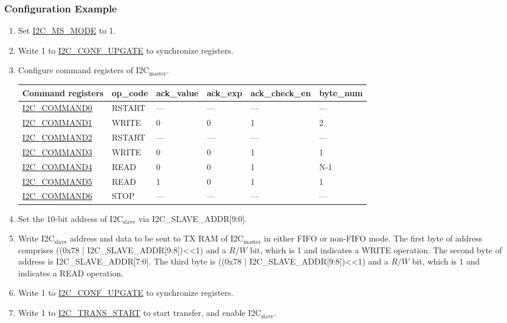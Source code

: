 \documentclass[main\_\_EN.tex]{subfiles}
\begin{document}
\subsubsection{Configuration Example}
\begin{enumerate}
\item Set \hyperref[fielddesc:I2CMSMODE]{I2C\_MS\_MODE} to 1.
\item Write 1 to \hyperref[fielddesc:I2CCONFUPGATE]{I2C\_CONF\_UPGATE} to synchronize registers.
\item Configure command registers of I2C$_\text{master}$.

\begin{longtable}{ | p{4cm} | p{2cm} | p{2cm} | p{2cm} |p{2cm} | p{2cm} |}
\hline\rowcolor{lightgray}
Command registers & op\_code & ack\_value&ack\_exp&ack\_check\_en&byte\_num  \\ \hline
\hyperref[fielddesc:I2CCOMMAND0]{I2C\_COMMAND0} & RSTART& ---&---&---&---  \\ \hline
\hyperref[fielddesc:I2CCOMMAND1]{I2C\_COMMAND1} & WRITE& 0&0&1&2  \\ \hline
\hyperref[fielddesc:I2CCOMMAND2]{I2C\_COMMAND2} & RSTART& ---&---&---&---  \\ \hline
\hyperref[fielddesc:I2CCOMMAND3]{I2C\_COMMAND3} & WRITE& 0&0&1&1  \\ \hline
\hyperref[fielddesc:I2CCOMMAND4]{I2C\_COMMAND4} & READ& 0&0&1&N-1  \\ \hline
\hyperref[fielddesc:I2CCOMMAND5]{I2C\_COMMAND5} & READ& 1&0&1&1  \\ \hline
\hyperref[fielddesc:I2CCOMMAND6]{I2C\_COMMAND6} & STOP& ---&---&---&---  \\ \hline
\end{longtable}

\item Set the 10-bit address of I2C$_\text{slave}$ via I2C\_SLAVE\_ADDR[9:0].
\item Write I2C$_\text{slave}$ address and data to be sent to TX RAM of I2C$_\text{master}$ in either FIFO or non-FIFO mode. The first byte of address comprises ((0x78 | I2C\_SLAVE\_ADDR[9:8])<<1) and a $R/\overline W$ bit, which is 1 and indicates a WRITE operation. The second byte of address is I2C\_SLAVE\_ADDR[7:0]. The third byte is ((0x78 | I2C\_SLAVE\_ADDR[9:8])<<1) and a $R/\overline W$ bit, which is 1 and indicates a READ operation.

\item Write 1 to \hyperref[fielddesc:I2CCONFUPGATE]{I2C\_CONF\_UPGATE} to synchronize registers.
\item Write 1 to \hyperref[fielddesc:I2CTRANSSTART]{I2C\_TRANS\_START}  to start transfer, and enable I2C$_\text{slave}$.


\end{enumerate}
\end{document}
